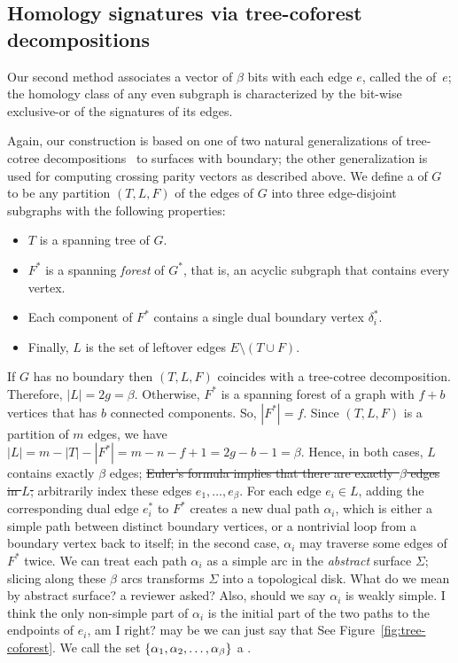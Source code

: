 \documentclass[letterpaper,review]{siamart190516}
\def\dualarc{\alpha}
\def\modified#1{\color{blue}#1 \color{black}}
\begin{document}
\subsection{Homology signatures via tree-coforest decompositions}
\label{sec:characterizing_signatures}

Our second method associates a vector of $\beta$ bits with each edge $e$, called the  of~$e$; the homology class of any even subgraph is characterized by the bit-wise exclusive-or of the signatures of its edges.

Again, our construction is based on one of two natural generalizations of tree-cotree
decompositions~\cite{e-dgteg-03} to surfaces with boundary; the other generalization is used for
computing crossing parity vectors as described above.
We define a  of $G$ to be any partition $(T, L, F)$ of the edges of $G$ into three edge-disjoint subgraphs with the following properties:
\begin{itemize}\itemsep0pt
\item $T$ is a spanning tree of $G$.
\item $F^*$ is a spanning \emph{forest} of $G^*$, that is, an acyclic subgraph that contains every vertex.
\item Each component of $F^*$ contains a single dual boundary vertex $\delta_i^*$.
\item Finally, $L$ is the set of leftover edges $E \setminus (T\cup F)$.
\end{itemize}
%
\modified{
If $G$ has no boundary then $(T, L, F)$ coincides with a tree-cotree decomposition.  Therefore, $|L| = 2g = \beta$.
Otherwise, $F^*$ is a spanning forest of a graph with $f+b$ vertices that has $b$ connected components.  So, $|F^*| = f$.
Since $(T, L, F)$ is a partition of $m$ edges, we have $|L| = m - |T| - |F^*| = m-n-f+1=2g-b-1=\beta$.
Hence, in both cases, $L$ contains exactly $\beta$ edges;
}
\sout{Euler's formula implies that there are exactly~$\beta$ edges in $L$;} arbitrarily index these edges $e_1, \dots, e_\beta$.  For each edge $e_i\in L$, adding the corresponding dual edge $e_i^*$ to $F^*$ creates a new dual path $\dualarc_i$, which is either a simple path between distinct boundary vertices, or a nontrivial loop from a boundary vertex back to itself; in the second case, $\dualarc_i$ may traverse some edges of $F^*$ twice.  We can treat each path $\dualarc_i$ as a simple arc in the \emph{abstract} surface $\Sigma$; slicing along these $\beta$ arcs transforms $\Sigma$ into a topological disk. \modified{What do we mean by abstract surface? a reviewer asked? Also, should we say $\alpha_i$ is weakly simple.  I think the only non-simple part of $\alpha_i$ is the initial part of the two paths to the endpoints of $e_i$, am I right? may be we can just say that}
See Figure~\ref{fig:tree-coforest}.  We call the set $\set{\dualarc_1, \dualarc_2, \dots, \dualarc_\beta}$ a .
\end{document}
